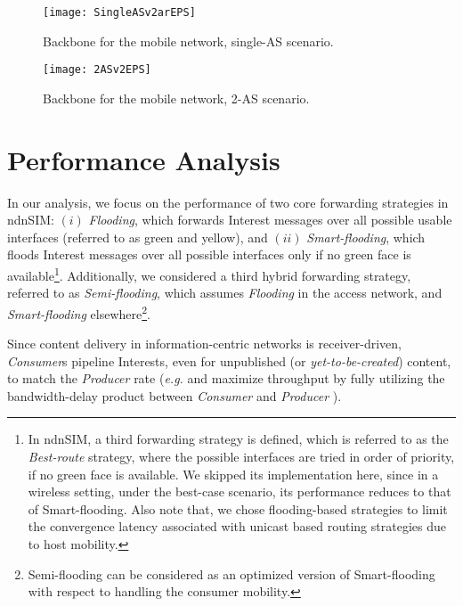 \documentclass[conference]{IEEEtran}
\begin{document}
\begin{figure}[htb]
  \centering
\texttt{[image: SingleASv2arEPS]}\\
  \caption{Backbone for the mobile network, single-AS scenario.}\label{CCN_wireless_scenario_2}
\end{figure}

\begin{figure}[htb]
  \centering
\texttt{[image: 2ASv2EPS]}\\
\caption{Backbone for the mobile network, 2-AS scenario.}\label{CCN_wireless_scenario_3}
\end{figure}

\section{Performance Analysis}\label{Section:Performance}

In our analysis, we focus on the performance of two core forwarding strategies in ndnSIM: $(i)$ \emph{Flooding}, which forwards Interest messages over all possible usable interfaces (referred to as green and yellow), and $(ii)$ \emph{Smart-flooding}, which floods Interest messages over all possible interfaces only if no green face is available\footnote{In ndnSIM, a third forwarding strategy is defined, which is referred to as the \emph{Best-route} strategy, where the possible interfaces are tried in order of priority, if no green face is available. We skipped its implementation here, since in a wireless setting, under the best-case scenario, its performance reduces to that of Smart-flooding. Also note that, we chose flooding-based strategies to limit the convergence latency associated with unicast based routing strategies due to host mobility.}. Additionally, we considered a third hybrid forwarding strategy, referred to as \emph{Semi-flooding}, which assumes \emph{Flooding} in the access network, and \emph{Smart-flooding} elsewhere\footnote{Semi-flooding can be considered as an optimized version of Smart-flooding with respect to handling the consumer mobility.}.

Since content delivery in information-centric networks is receiver-driven, \emph{Consumer}s pipeline Interests, even for unpublished (or \emph{yet-to-be-created}) content, to match the \emph{Producer} rate (\emph{e.g.} and maximize throughput by fully utilizing the bandwidth-delay product between \emph{Consumer} and \emph{Producer} \cite{VoCCN}).
\end{document}
